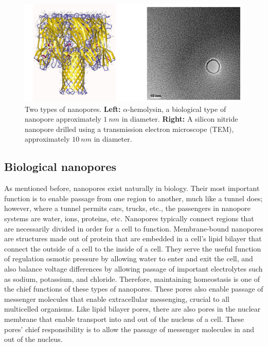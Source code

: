 		\begin{figure}[h]
			\includegraphics[width=\textwidth]{bio_synth_nanopores.png}
			\caption{Two types of nanopores. \textbf{Left:} $\alpha$-hemolysin, a biological type of nanopore approximately $\SI{1}{nm}$ in diameter. \textbf{Right:} A silicon nitride nanopore drilled using a transmission electron microscope (TEM), approximately $\SI{10}{nm}$ in diameter.}
		\end{figure}

		\subsection{Biological nanopores}

			As mentioned before, nanopores exist naturally in biology. Their most important function is to enable passage from one region to another, much like a tunnel does; however, where a tunnel permits cars, trucks, etc., the passengers in nanopore systems are water, ions, proteins, etc. Nanopores typically connect regions that are necessarily divided in order for a cell to function. Membrane-bound nanopores are structures made out of protein that are embedded in a cell's lipid bilayer that connect the outside of a cell to the inside of a cell. They serve the useful function of regulation osmotic pressure by allowing water to enter and exit the cell, and also balance voltage differences by allowing passage of important electrolytes such as sodium, potassium, and chloride. Therefore, maintaining homeostasis is one of the chief functions of these types of nanopores. These pores also enable passage of messenger molecules that enable extracellular messenging, crucial to all multicelled organisms. Like lipid bilayer pores, there are also pores in the nuclear membrane that enable transport into and out of the nucleus of a cell. These pores' chief responsibility is to allow the passage of messenger molecules in and out of the nucleus. 

